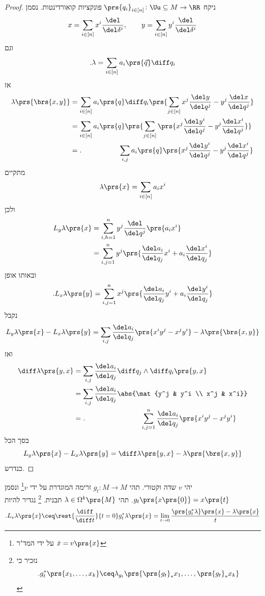 \documentclass[a4paper,10pt,twoside,openany]{book}
\begin{document}
\begin{proof}
ניקח
$\prs{q_i}_{i\in[n]} \colon \Uu \subseteq M \to \RR$
פונקציות קואורדינטות.
נסמן
\[x = \sum_{i\in[n]} x^i \frac{\del}{\del \delta^i}, \qquad y = \sum_{i\in[n]} y^i \frac{\del}{\del \delta^i}\]
וגם
\[\text{.} \lambda = \sum_{i\in[n]} a_i\prs{\vec{q}} \diff q_i\]
אז
\begin{align*}
\lambda\prs{\brs{x,y}} &= \sum_{i\in[n]} a_i \prs{q} \diff q_i \prs{\sum_{j \in [n]} x^j \frac{\del y}{\del q^j} - y^j \frac{\del x}{\del q^j}} \\
&= \sum_{i \in [n]} a_i\prs{q} \prs{\sum_{j\in[n]} \prs{x^j \frac{\del y^i}{\del q^j} - y^j \frac{\del x^i}{\del q^j}}} \\&=
\text{.} \phantom{\lambda\prs{x,y}} \sum_{i,j} a_i\prs{q}\prs{x^j \frac{\del y^i}{\del q^j} - y^j \frac{\del x^i}{\del q^j}}
\end{align*}
מתקיים
\[\lambda\prs{x} = \sum_{i \in [n]} a_i x^i\]
ולכן
\begin{align*}
L_y \lambda\prs{x} &= \sum_{i,h=1}^n y^j \frac{\del}{\del q^j}\prs{a_i x^i} \\&=
\sum_{i,j = 1}^n y^j \prs{\frac{\del a_i}{\del q_j} x^i + a_i \frac{\del x^i}{\del q_j}}
\end{align*}
ובאותו אופן
\[\text{.} L_x \lambda\prs{y} = \sum_{i,j =1}^n x^j\prs{\frac{\del a_i}{\del q_j} y^i + a_i \frac{\del y^i}{\del q_j}}\]
נקבל
\[L_y \lambda\prs{x} - L_x\lambda\prs{y} = \sum_{i,j} \frac{\del a_i}{\del q_j} \prs{x^i y^j - x^j y^i} - \lambda\prs{\brs{x,y}}\]
ואז
\begin{align*}
\diff \lambda\prs{y,x} &= \sum_{i,j} \frac{\del a_i}{\del q_j} \diff q_j \wedge \diff q_i \prs{y,x} \\&= \sum_{i,j} \frac{\del a_i}{\del q_j} \abs{\mat{y^j & y^i \\ x^j & x^i}} \\&= \text{.} \phantom{\diff \lambda\prs{x,y}} \sum_{i,j = 1}^n \frac{\del a_i}{\del q_j} \prs{x^i y^j - x^j y^i}
\end{align*}
בסך הכל
\[L_y \lambda\prs{x} - L_x \lambda\prs{y} = \diff \lambda\prs{y,x} - \lambda\prs{\brs{x,y}}\]
כנדרש.
\end{proof}
\begin{definition}
יהי
$v$
שדה וקטורי.
תהי
$g_t \colon M \to M$
זרימה המוגדרת על ידי
$v$\footnote{על ידי המד"ר
$\dot{x} = v\prs{x}$}
ונסמן
$g_t\prs{x\prs{0}} = x\prs{t}$.
תהי
$\lambda \in \Omega^k\prs{M}$
תבנית.%
\footnote{
נזכיר כי
\[\text{.} g_t^* \prs{x_1, \ldots, x_k} \ceq \lambda_{g_t}\prs{\prs{g_t}_* x_1, \ldots, \prs{g_t}_* x_k}\]
}
נגדיר
להיות
\begin{align*}
\text{.} L_v \lambda \prs{x} \ceq \rest{\frac{\diff}{\diff t}}{t=0} g_t^* \lambda\prs{x} = \lim_{t\to 0} \frac{\prs{g_t^* \lambda}\prs{x} - \lambda\prs{x}}{t}
\end{align*}
\end{definition}
\end{document}
